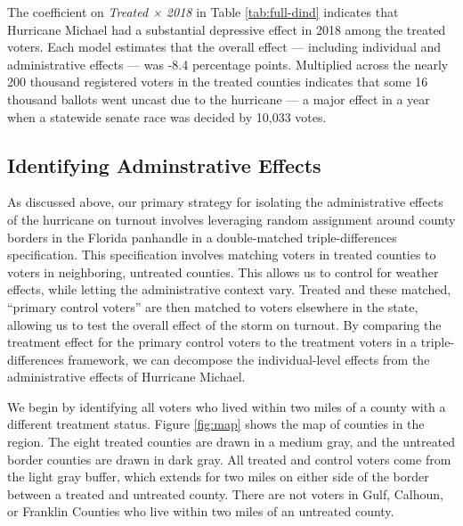 \documentclass[
  12pt,
]{article}
\begin{document}
\begin{singlespace}

\end{singlespace}

The coefficient on \emph{Treated × 2018} in Table \ref{tab:full-dind} indicates that Hurricane Michael had a substantial depressive effect in 2018 among the treated voters. Each model estimates that the overall effect --- including individual and administrative effects --- was -8.4 percentage points. Multiplied across the nearly 200 thousand registered voters in the treated counties indicates that some 16 thousand ballots went uncast due to the hurricane --- a major effect in a year when a statewide senate race was decided by 10,033 votes.

\hypertarget{identifying-adminstrative-effects}{%
\subsection*{Identifying Adminstrative Effects}\label{identifying-adminstrative-effects}}

As discussed above, our primary strategy for isolating the administrative effects of the hurricane on turnout involves leveraging random assignment around county borders in the Florida panhandle in a double-matched triple-differences specification. This specification involves matching voters in treated counties to voters in neighboring, untreated counties. This allows us to control for weather effects, while letting the administrative context vary. Treated and these matched, ``primary control voters'' are then matched to voters elsewhere in the state, allowing us to test the overall effect of the storm on turnout. By comparing the treatment effect for the primary control voters to the treatment voters in a triple-differences framework, we can decompose the individual-level effects from the administrative effects of Hurricane Michael.

We begin by identifying all voters who lived within two miles of a county with a different treatment status. Figure \ref{fig:map} shows the map of counties in the region. The eight treated counties are drawn in a medium gray, and the untreated border counties are drawn in dark gray. All treated and control voters come from the light gray buffer, which extends for two miles on either side of the border between a treated and untreated county. There are not voters in Gulf, Calhoun, or Franklin Counties who live within two miles of an untreated county.
\end{document}
